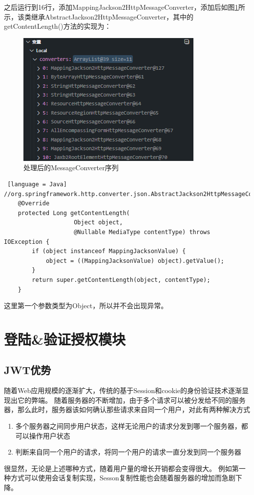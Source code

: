 之后运行到16行，添加MappingJackson2HttpMessageConverter，添加后如图\ref{MessageConverter-list-after-add}所示，该类继承AbstractJackson2HttpMessageConverter，其中的getContentLength()方法的实现为：

\begin{figure}[H]
  \centering
  \includegraphics[scale = 0.8]{out/figure/统一返回对象/WebMvcConfiguration-MessageConverter-debug-after-add.png}
  \caption{\song\wuhao 处理后的MessageConverter序列}
  \label{MessageConverter-list-after-add}
\end{figure}

\begin{lstlisting} [language = Java]
//org.springframework.http.converter.json.AbstractJackson2HttpMessageConverter;
	@Override
	protected Long getContentLength(
                    Object object, 
                    @Nullable MediaType contentType) throws IOException {
		if (object instanceof MappingJacksonValue) {
			object = ((MappingJacksonValue) object).getValue();
		}
		return super.getContentLength(object, contentType);
	}
\end{lstlisting}

这里第一个参数类型为Object，所以并不会出现异常。

\section{登陆\&验证授权模块}

\subsection{JWT优势}

随着Web应用规模的逐渐扩大，传统的基于Session和cookie的身份验证技术逐渐显现出它的弊端。
随着服务器的不断增加，由于多个请求可以被分发给不同的服务器，那么此时，服务器该如何确认那些请求来自同一个用户，对此有两种解决方式
\begin{enumerate}
  \item 多个服务器之间同步用户状态，这样无论用户的请求分发到哪一个服务器，都可以操作用户状态
  \item 判断来自同一个用户的请求，将同一个用户的请求一直分发到同一个服务器
\end{enumerate}
很显然，无论是上述哪种方式，随着用户量的增长开销都会变得很大。
例如第一种方式可以使用会话复制实现，Sesson复制性能也会随着服务器的增加而急剧下降。\cite{.2019h}

